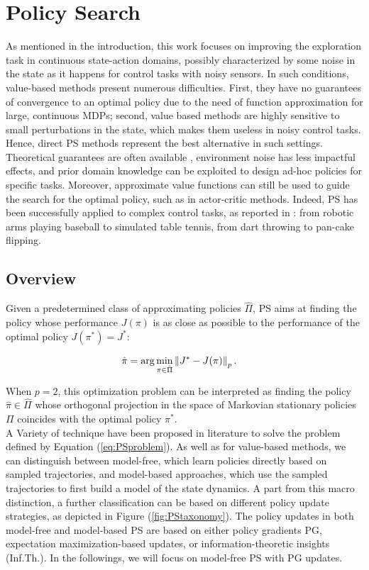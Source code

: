 \section{Policy Search}
As mentioned in the introduction, this work focuses on improving the exploration task in continuous state-action domains, possibly characterized by some noise in the state as it happens for control tasks with noisy sensors. In such conditions, value-based methods present numerous difficulties. First, they have no guarantees of convergence to an optimal policy due to the need of function approximation for large, continuous \gls{MDP}s; second, value based methods are highly sensitive to small perturbations in the state, which makes them useless in noisy control tasks. Hence, direct \gls{PS} methods represent the best alternative in such settings. Theoretical guarantees are often available \cite{more1994line}, environment noise has less impactful effects, and prior domain knowledge can be exploited to design ad-hoc policies for specific tasks. Moreover, approximate value functions can still be used to guide the search for the optimal policy, such as in actor-critic methods. Indeed, \gls{PS} has been successfully applied to complex control tasks, as reported in \cite{deisenroth2013survey}: from robotic arms playing baseball to simulated table tennis, from dart throwing to pan-cake flipping. 

\subsection{Overview}
Given a predetermined class of approximating policies $\hat{\Pi}$, \gls{PS} aims at finding the policy whose performance $J(\pi)$ is as close as possible to the performance of the optimal policy $J(\pi^*)=J^*$:

\begin{align}
\hat{\pi} &= \arg \min_{\pi\in\hat{\Pi}}\left\lVert J^*-J(\pi)\right\rVert_p. \label{eq:PSproblem}
\end{align}

When $p=2$, this optimization problem can be interpreted as finding the policy $\hat{\pi}\in\hat{\Pi}$ whose orthogonal projection in the space of Markovian stationary policies $\Pi$ coincides with the optimal policy $\pi^*$. \\
A Variety of technique have been proposed in literature to solve the problem defined by Equation (\ref{eq:PSproblem}). As well as for value-based methods, we can distinguish between model-free, which learn policies directly based on sampled trajectories, and model-based approaches, which use the sampled trajectories to first build a model of the state dynamics. A part from this macro distinction, a further classification can be based on different policy update strategies, as depicted in Figure (\ref{fig:PStaxonomy}). The policy updates in both model-free and model-based \gls{PS} are based on either policy gradients \gls{PG}, expectation maximization-based updates, or information-theoretic insights (Inf.Th.). In the followings, we will focus on model-free \gls{PS} with \gls{PG} updates.

